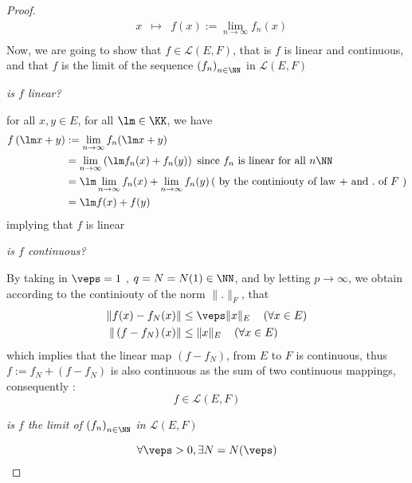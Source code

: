 \begin{proof}
\[\begin{array}{cccc}
	           &  x  & \longmapsto     & f(x) := 
		   \lim_{n \to \infty } f_{n}(x) \\ 
	\end{array}
	\]
	Now, we are going to show that $f \in \mathcal{L}(E,F)$, 
	that is $f$ is linear and continuous, and that $f$ 
	is the limit of the sequence $\left( f_{n} \right)_{n \in \NN}$  in 
	$\mathcal{L} (E,F)$
	\begin{center}
		\it is $f$  linear? 
	\end{center}
	\normalfont
	for all $x, y \in E$, for all $\lm \in \KK$, we have 
	\begin{align*}
		f \left( \lm x + y \right) & := 
		\lim_{n \to \infty } 
		f_{n}(\lm x + y)  \\
					   & =
					   \lim_{n \to \infty } 
					  \left( 
						  \lm f_{n}(x) + 
						  f_{n}(y) 
					  \right) \hfill
					  \text{ since $f_{n}$ is 
					  linear for all $n \NN$ } \\
					   &= 
					   \lm\lim_{n \to \infty} f_{n}(x)  
					   + 
					   \lim_{n \to \infty }  f_{n}(y)  
					   \hfill 
					   \left( \text{ by the continiouty 
					   of law $+$ and $.$ of $F$   }  \right)
					   \\
					    & =
					    \lm f(x)  + f(y)  
	\end{align*}
	implying that $f$ is linear
	\begin{center}
		\it is $f$ continuous?
	\end{center}
	\normalfont
		\normalfont By taking in 
		$\veps  = 1$ , $q = N = N (1) \in \NN $, and by letting
		$p \rightarrow \infty $, we obtain according to the continiouty
		of the norm $\| . \| _{F}$, that 
		\begin{align*}
			\| f(x) - f_{N}(x)  \|  & \leq 
			\veps  \| x \| _{E} \quad 
			\left( \forall  x \in E \right) \\
			\| \left( f- f_{N}  \right)(x)  \|  & \leq 
			\| x \| _{E} \quad 
			\left( \forall  x \in E \right)
		\end{align*}
		which implies that the linear map $\left( f-f_{N} \right)$, from 
		$E$ to $F$ is continuous, thus $f := f_{N} + \left( f-f_{N} \right)$ 
		is also continuous as the sum of two continuous 
		mappings, consequently : 
		\[
		f \in \mathcal{L} (E,F)  
		\]
		\begin{center}
			\it
			is $f$ the limit of $\left( f_{n} \right)_{n \in \NN}$  
			in $\mathcal{L}(E,F) $ 
		\end{center}
		\normalfont
		\[
		\forall  \veps  > 0, \exists N= N(\veps )  
\]
\end{proof}
